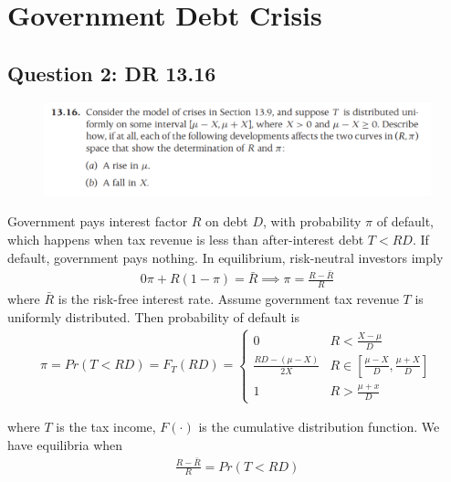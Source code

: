 \documentclass{article}
\newcommand{\?}{\textcolor{red}{(?)}} %
\begin{document}
    \section{Government Debt Crisis}
    
    \subsection{Question 2: DR 13.16}
        \begin{figure}[h!]
            \centering
            \includegraphics[width=\textwidth]{./HW7-DR13.16.png}
        \end{figure}
        
        Government pays interest factor $R$ on debt $D$, with probability $\pi$ of default, which happens when tax revenue is less than after-interest debt $T < RD$. If default, government pays nothing. In equilibrium, risk-neutral investors imply
        \begin{align}
            0 \pi + R (1-\pi) = \bar R
            \implies
            \pi = \frac{R - \bar R}{R}
        \end{align}
        where $\bar R$ is the risk-free interest rate. Assume government tax revenue $T$ is uniformly distributed. Then probability of default is
        \begin{align}
            \pi = Pr(T < RD)
            = F_{T}(RD)
            = \begin{cases}
                0
                & R < \frac{X - \mu}{D}
                \\
                \frac{RD - (\mu - X)}{2X}
                & R \in \left[
                    \frac{\mu-X}{D}, \frac{\mu+X}{D}
                    \right]
                \\
                1
                & R > \frac{\mu + x}{D}
            \end{cases}
        \end{align}
        
        where $T$ is the tax income, $F(\cdot)$ is the cumulative distribution function. We have equilibria when
        \begin{align}
            \frac{R - \bar R}{R} = Pr(T < RD)
        \end{align}
        
\end{document}

